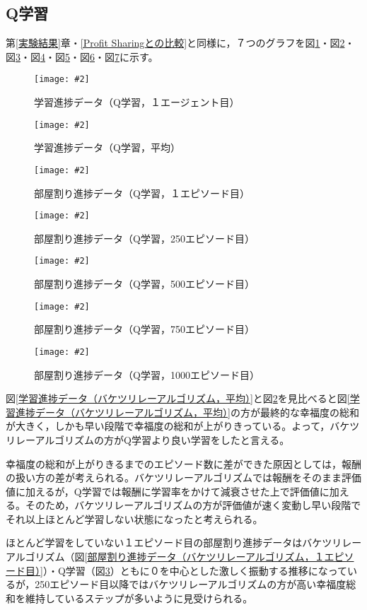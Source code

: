 \documentclass[titlepage]{ltjsreport}
\newcommand{\image}[2]{\begin{figure}[h]\vspace{1em}\begin{center}\texttt{[image: \#2]}\caption{#1}\label{#1}\end{center}\end{figure}}
\begin{document}
\subsection{Q学習}
\label{Q学習との比較}
第\ref{実験結果}章・\ref{Profit Sharingとの比較}と同様に，７つのグラフを図\ref{学習進捗データ（Q学習，１エージェント目）}・図\ref{学習進捗データ（Q学習，平均）}・図\ref{部屋割り進捗データ（Q学習，１エピソード目）}・図\ref{部屋割り進捗データ（Q学習，250エピソード目）}・図\ref{部屋割り進捗データ（Q学習，500エピソード目）}・図\ref{部屋割り進捗データ（Q学習，750エピソード目）}・図\ref{部屋割り進捗データ（Q学習，1000エピソード目）}に示す。
\image{学習進捗データ（Q学習，１エージェント目）}{外部ファイル/学習進捗データ/Q学習/１エージェント目.png}
\image{学習進捗データ（Q学習，平均）}{外部ファイル/学習進捗データ/Q学習/平均.png}
\image{部屋割り進捗データ（Q学習，１エピソード目）}{外部ファイル/部屋割り進捗データ/Q学習/１エピソード目}
\image{部屋割り進捗データ（Q学習，250エピソード目）}{外部ファイル/部屋割り進捗データ/Q学習/250エピソード目}
\image{部屋割り進捗データ（Q学習，500エピソード目）}{外部ファイル/部屋割り進捗データ/Q学習/500エピソード目}
\image{部屋割り進捗データ（Q学習，750エピソード目）}{外部ファイル/部屋割り進捗データ/Q学習/750エピソード目}
\image{部屋割り進捗データ（Q学習，1000エピソード目）}{外部ファイル/部屋割り進捗データ/Q学習/1000エピソード目}

図\ref{学習進捗データ（バケツリレーアルゴリズム，平均）}と図\ref{学習進捗データ（Q学習，平均）}を見比べると図\ref{学習進捗データ（バケツリレーアルゴリズム，平均）}の方が最終的な幸福度の総和が大きく，しかも早い段階で幸福度の総和が上がりきっている。よって，バケツリレーアルゴリズムの方がQ学習より良い学習をしたと言える。

幸福度の総和が上がりきるまでのエピソード数に差ができた原因としては，報酬の扱い方の差が考えられる。バケツリレーアルゴリズムでは報酬をそのまま評価値に加えるが，Q学習では報酬に学習率をかけて減衰させた上で評価値に加える。そのため，バケツリレーアルゴリズムの方が評価値が速く変動し早い段階でそれ以上ほとんど学習しない状態になったと考えられる。

ほとんど学習をしていない１エピソード目の部屋割り進捗データはバケツリレーアルゴリズム（図\ref{部屋割り進捗データ（バケツリレーアルゴリズム，１エピソード目）}）・Q学習（図\ref{部屋割り進捗データ（Q学習，１エピソード目）}）ともに０を中心とした激しく振動する推移になっているが，250エピソード目以降ではバケツリレーアルゴリズムの方が高い幸福度総和を維持しているステップが多いように見受けられる。
\end{document}
